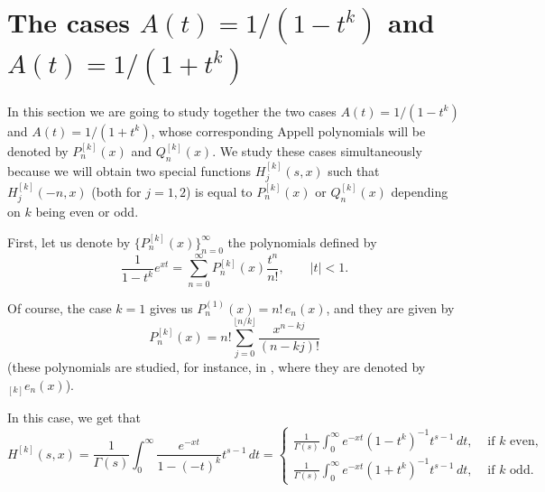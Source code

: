 \documentclass[11pt,a4paper]{amsart}
\theoremstyle{plain}
\theoremstyle{plain}
\theoremstyle{remark}
\numberwithin{equation}{section}
\begin{document}
\section{The cases $A(t) = 1/(1-t^k)$ and $A(t) = 1/(1+t^k)$}
\label{sec:1+-tk}

In this section we are going to study together the two cases $A(t) = 1/(1-t^k)$ and $A(t) = 1/(1+t^k)$, whose corresponding Appell polynomials will be denoted by $P_n^{[k]}(x)$ and $Q_n^{[k]}(x)$. We study these cases simultaneously because we will obtain two special functions $H_{j}^{[k]}(s,x)$ such that $H_{j}^{[k]}(-n,x)$ (both for $j=1,2$) is equal to $P_n^{[k]}(x)$ or $Q_n^{[k]}(x)$ depending on $k$ being even or odd.

First, let us denote by $\{P_n^{[k]}(x)\}_{n=0}^{\infty}$ the polynomials defined by
\begin{equation*}
  \frac{1}{1-t^k} e^{xt} = \sum_{n=0}^{\infty} P_n^{[k]}(x) \frac{t^n}{n!},
  \qquad |t| < 1.
\end{equation*}

Of course, the case $k=1$ gives us $P_n^{(1)}(x) = n!\,e_n(x)$, and they are given by
\[
P_n^{[k]}(x) = n!\sum_{j=0}^{\lfloor {n}/{k} \rfloor} \frac{x^{n-kj}}{(n-kj)!}
\]
(these polynomials are studied, for instance, in \cite[(1.19)]{KYA}, where they are denoted by ${}_{[k]}e_n(x)$).

In this case, we get that
\begin{equation*}
  H^{[k]}(s,x) = \frac{1}{\Gamma(s)}\int_{0}^{\infty} \frac{e^{-xt}}{1-(-t)^k} t^{s-1}\,dt 
= 
\begin{cases}
  \frac{1}{\Gamma(s)}\int_{0}^{\infty} e^{-xt}(1-t^k)^{-1} t^{s-1}\,dt, 
    & \text{ if } k \text{ even,} \\[6pt]
  \frac{1}{\Gamma(s)}\int_{0}^{\infty} e^{-xt}(1+t^k)^{-1} t^{s-1}\,dt, 
    & \text{ if } k \text{ odd.} 
\end{cases}
\end{equation*}
\end{document}
